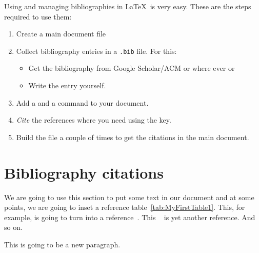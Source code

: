 \documentclass[twocolumn]{article}
\begin{document}
\medskip
Using and managing bibliographies in \LaTeX\ is very easy. 
These are the steps required to use them: 

\begin{enumerate}
	\item Create a main document file 
	\item Collect bibliography entries in a \verb|.bib| file. For this: 
	\begin{itemize}
		\item Get the bibliography from Google Scholar/ACM or where ever or 
		\item Write the entry yourself. 
	\end{itemize}
	\item Add a \verb|| and a \verb|| command to your document. 
	\item \emph{Cite} the references where you need using the key. 
	\item Build the file a couple of times to get the citations in the main document. 
\end{enumerate}




\section{Bibliography citations}
We are going to use this section to put some text in our document and at some points, we are going to inset a reference table~\ref{tab:MyFirstTable1}. This, for example, is going to turn into a reference~\cite{lecun2015deep}. This ~\cite{webster1984specific} is yet another reference. And so on.~\cite{nauman2010apex}

This is going to be a new paragraph.







\end{document}
